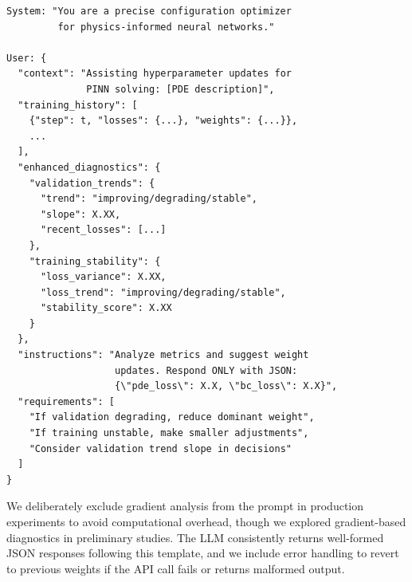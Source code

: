 \documentclass{article}
\begin{document}
\begin{verbatim}
System: "You are a precise configuration optimizer 
         for physics-informed neural networks."

User: {
  "context": "Assisting hyperparameter updates for 
              PINN solving: [PDE description]",
  "training_history": [
    {"step": t, "losses": {...}, "weights": {...}},
    ...
  ],
  "enhanced_diagnostics": {
    "validation_trends": {
      "trend": "improving/degrading/stable",
      "slope": X.XX,
      "recent_losses": [...]
    },
    "training_stability": {
      "loss_variance": X.XX,
      "loss_trend": "improving/degrading/stable",
      "stability_score": X.XX
    }
  },
  "instructions": "Analyze metrics and suggest weight 
                   updates. Respond ONLY with JSON: 
                   {\"pde_loss\": X.X, \"bc_loss\": X.X}",
  "requirements": [
    "If validation degrading, reduce dominant weight",
    "If training unstable, make smaller adjustments",
    "Consider validation trend slope in decisions"
  ]
}
\end{verbatim}

We deliberately exclude gradient analysis from the prompt in production experiments to avoid computational overhead, though we explored gradient-based diagnostics in preliminary studies. The LLM consistently returns well-formed JSON responses following this template, and we include error handling to revert to previous weights if the API call fails or returns malformed output.
\end{document}
